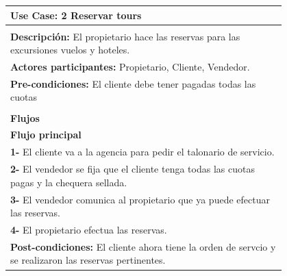 \documentclass[12pt,a4paper,titlepage,oneside]{article}
\begin{document}
\begin{tabular}{| l | p{0.8\linewidth} |} \hline
	\multicolumn{2}{|p{0.8\linewidth}|}{\textbf{Use Case:} 2 Reservar tours} \\ \hline
	\multicolumn{2}{|c|}{} \\ \hline
	\multicolumn{2}{|p{0.8\linewidth}|}{\textbf{Descripci\'on:} El propietario hace las reservas para las excursiones vuelos y hoteles.} \\ \hline
	\multicolumn{2}{|p{0.8\linewidth}|}{\textbf{Actores participantes:} Propietario, Cliente, Vendedor.} \\ \hline
	\multicolumn{2}{|p{0.8\linewidth}|}{\textbf{Pre-condiciones:} El cliente debe tener pagadas todas las cuotas} \\ \hline
	\multicolumn{2}{|c|}{} \\ \hline
	\multicolumn{2}{|p{0.8\linewidth}|}{\textbf{Flujos}} \\ \hline
	\multicolumn{2}{|p{0.8\linewidth}|}{\textbf{Flujo principal}} \\ \hline
	\multicolumn{2}{|p{0.8\linewidth}|}{\textbf{1-} El cliente va a la agencia para pedir el talonario de servicio.} \\ \hline
	\multicolumn{2}{|p{0.8\linewidth}|}{\textbf{2-} El vendedor se fija que el cliente tenga todas las cuotas pagas y la chequera sellada.} \\ \hline
	\multicolumn{2}{|p{0.8\linewidth}|}{\textbf{3-} El vendedor comunica al propietario que ya puede efectuar las reservas.} \\ \hline
		\multicolumn{2}{|p{0.8\linewidth}|}{\textbf{4-} El propietario efectua las reservas.} \\ \hline
	\multicolumn{2}{|p{0.8\linewidth}|}{\textbf{Post-condiciones:} El cliente ahora tiene la orden de servcio y se realizaron las reservas pertinentes.}\\ \hline
\end{tabular} \\\\
 \\\\
\end{document}
